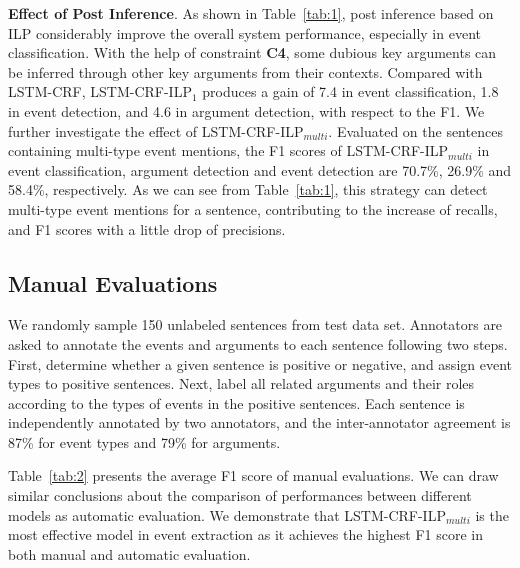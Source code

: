 \documentclass{article}
\begin{document}
\vspace{1em}
\noindent \textbf{Effect of Post Inference}. As shown in Table~\ref{tab:1}, post inference based on ILP considerably improve the overall system performance, especially in event classification. With the help of constraint \textbf{C4},  some dubious key arguments can be inferred through other key arguments from their contexts. Compared with LSTM-CRF, LSTM-CRF-ILP$_1$ produces a gain of 7.4 in event classification, 1.8 in event detection, and 4.6 in argument detection, with respect to the F1. We further investigate the effect of LSTM-CRF-ILP$_{multi}$.  
Evaluated on the sentences containing multi-type event mentions, the F1 scores of LSTM-CRF-ILP$_{multi}$ in event classification, argument detection and event detection are 70.7\%, 26.9\% and 58.4\%, respectively. 
As we can see from Table~\ref{tab:1}, this strategy can detect multi-type event mentions for a sentence, contributing to the increase of recalls, and F1 scores with a little drop of precisions.

\subsection{Manual Evaluations}
We randomly sample 150 unlabeled sentences from test data set. Annotators are asked to annotate the events and arguments to each sentence following two steps. First, determine whether a given sentence is positive or negative, and assign event types to positive sentences. Next, label all related arguments and their roles according to the types of events in the positive sentences. Each sentence is independently annotated by two annotators, and the inter-annotator agreement is 87\% for event types and 79\% for arguments.

Table~\ref{tab:2} presents the average F1 score of manual evaluations. We can draw similar conclusions about the comparison of performances between different models as automatic evaluation. We demonstrate that LSTM-CRF-ILP$_{multi}$ is the most effective model in event extraction as it achieves the highest F1 score in both manual and automatic evaluation.
\end{document}
